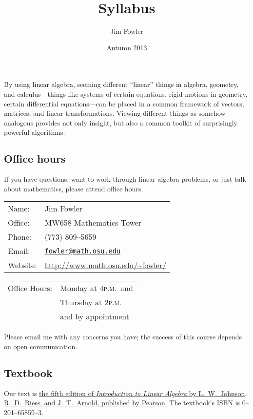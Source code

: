 \documentclass[12pt]{handout}
\title{Syllabus}
\author{Jim Fowler}
\date{Autumn 2013}
\newcommand{\peem}{\textsc{p.m.}}
\begin{document}
\maketitle

\noindent By using linear algebra, seeming different ``linear'' things
in algebra, geometry, and calculus---things like systems of certain
equations, rigid motions in geometry, certain differential
equations---can be placed in a common framework of vectors, matrices,
and linear transformations.  Viewing different things as somehow
analogous provides not only insight, but also a common toolkit of
surprisingly powerful algorithms.



\subsection*{Office hours}
If you have questions, want to work through linear algebra problems, or just talk
about mathematics, please attend office hours.

\vspace{1ex}%
\noindent\parbox{0.5\textwidth}{%
\noindent\begin{tabular}{@{}ll}
\textsf{Name:} & Jim Fowler \\
\textsf{Office:} & MW658 Mathematics Tower \\
\textsf{Phone:} & (773) 809--5659 \\
\textsf{Email:} & \href{mailto:fowler@math.osu.edu}{\texttt{fowler@math.osu.edu}} \\
\textsf{Website:} & \url{http://www.math.osu.edu/~fowler/}
\end{tabular}}
\noindent\parbox{0.5\textwidth}{%
\begin{tabular}{@{}ll}
\textsf{Office Hours:}
& Monday at 4\peem\ and \\
& Thursday at 2\peem \\
& and by appointment
\end{tabular}}

\vspace{1ex}\noindent
Please email me with any concerns you have; the success of this course
depends on open communication.

\subsection*{Textbook}
Our text is \href{http://books.google.com/books?id=rtKpQgAACAAJ&dq=isbn:0201658593}{the fifth edition of \textit{Introduction to Linear Algebra} by L.~W.~Johnson, R.~D.~Riess, and J.~T.~Arnold, published by Pearson.}  The textbook's ISBN is 0--201--65859--3.
\end{document}
